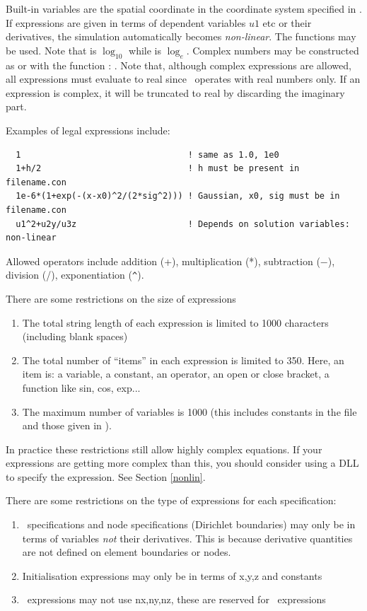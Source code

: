 \documentclass[a4paper,twoside,11pt]{book}
\begin{document}
Built-in variables  are the spatial coordinate in the
coordinate system specified in . If expressions are
given in terms of dependent variables $u1$ etc or their derivatives,
the simulation automatically becomes \emph{non-linear}. The functions
 may be used. Note that  is $\log_{10}$ while
 is $\log_e$. Complex numbers may be constructed as
 or with the function :
. Note that, although complex expressions are
allowed, all expressions must evaluate to real since \zinc\ operates
with real numbers only. If an expression is complex, it will be
truncated to real by discarding the imaginary part.

Examples of legal expressions include:
\begin{verbatim}
  1                                 ! same as 1.0, 1e0
  1+h/2                             ! h must be present in filename.con
  1e-6*(1+exp(-(x-x0)^2/(2*sig^2))) ! Gaussian, x0, sig must be in filename.con
  u1^2+u2y/u3z                      ! Depends on solution variables: non-linear
\end{verbatim}

Allowed operators include addition (+), multiplication (*), subtraction ($-$),
division (/), exponentiation (\verb+^+).

There are some restrictions on the size of expressions
\begin{enumerate}
\item The total string length of each expression is limited to 1000
  characters (including blank spaces)
\item The total number of ``items'' in each expression is limited to
  350. Here, an item is: a variable, a constant, an operator, an open
  or close bracket, a function like sin, cos, exp...
\item The maximum number of variables is 1000 (this includes constants
  in the  file and those given in ).
\end{enumerate}
In practice these restrictions still allow highly complex
equations. If your expressions are getting more complex than this, you
should consider using a DLL to specify the expression. See Section
\ref{nonlin}.

There are some restrictions on the type of expressions for each specification:
\begin{enumerate}
\item \qg\ specifications and node specifications (Dirichlet
  boundaries) may only be in terms of variables \emph{not} their
  derivatives. This is because derivative quantities are not
  defined on element boundaries or nodes.
\item Initialisation expressions may only be in terms of x,y,z and constants
\item \caf\ expressions may not use nx,ny,nz, these are reserved for \qg\ expressions
\end{enumerate}
\end{document}

